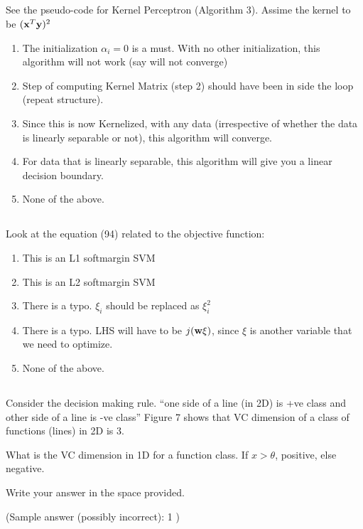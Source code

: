 \begin{frame}
\section{}
See the pseudo-code for Kernel Perceptron (Algorithm 3). Assime the kernel to be
$({\bf x}^T{\bf y})^2$
\begin{enumerate}[label=(\Alph*)]
\item The initialization $\alpha_i=0$ is a must. With no other initialization, this algorithm will not work (say will not converge)
\item Step of computing Kernel Matrix (step 2) should have been in side the loop (repeat structure).
\item Since this is now Kernelized, with any data (irrespective of whether the data is linearly separable or not), this algorithm will converge.
\item For data that is linearly separable, this algorithm will give you a linear decision boundary.
\item None of the above.  %
\end{enumerate}
\end{frame}


\begin{frame}
\section{}
Look at the equation (94) related to the objective function:
\begin{enumerate}[label=(\Alph*)]
\item This is an L1 softmargin SVM  %
\item This is an L2 softmargin SVM
\item There is a typo. $\xi_i$ should be replaced as $\xi_i^2$
\item There is a typo. LHS will have to be $j({\bf w}{\bf \xi})$, since $\xi$ is another variable that we need to optimize.
\item None of the above.    %
\end{enumerate}
\end{frame}

\begin{frame}
\section{}
Consider the decision making rule. ``one side of a line (in 2D) is +ve class and other side of a line is -ve class''  Figure 7 shows that VC dimension of a class of functions (lines) in 2D is 3.

What is the VC dimension in 1D for a function class. If $x>\theta$, positive, else negative.

Write your answer in the space provided.

(Sample answer (possibly incorrect): 1 )
\end{frame}
